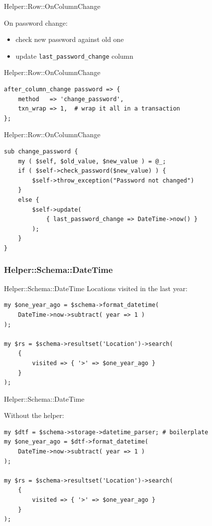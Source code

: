 \begin{frame}[fragile]{Helper::Row::OnColumnChange}

On password change:

\begin{itemize}
\item check new password against old one
\item update \verb|last_password_change| column
\end{itemize}

\end{frame}

\begin{frame}[fragile]{Helper::Row::OnColumnChange}
\begin{lstlisting}
after_column_change password => {
    method   => 'change_password',
    txn_wrap => 1,  # wrap it all in a transaction
};
\end{lstlisting}
\end{frame}

\begin{frame}[fragile]{Helper::Row::OnColumnChange}
\begin{lstlisting}
sub change_password {
    my ( $self, $old_value, $new_value ) = @_;
    if ( $self->check_password($new_value) ) {
        $self->throw_exception("Password not changed")
    }
    else {
        $self->update(
            { last_password_change => DateTime->now() }
        );
    }
}
\end{lstlisting}
\end{frame}

\subsubsection{Helper::Schema::DateTime}

\begin{frame}[fragile]{Helper::Schema::DateTime}
Locations visited in the last year:

\begin{lstlisting}
my $one_year_ago = $schema->format_datetime(
    DateTime->now->subtract( year => 1 )
);

my $rs = $schema->resultset('Location')->search(
    {
        visited => { '>' => $one_year_ago }
    }
);
\end{lstlisting}
\end{frame}

\begin{frame}[fragile]{Helper::Schema::DateTime}

Without the helper:

\begin{lstlisting}
my $dtf = $schema->storage->datetime_parser; # boilerplate
my $one_year_ago = $dtf->format_datetime(
    DateTime->now->subtract( year => 1 )
);

my $rs = $schema->resultset('Location')->search(
    {
        visited => { '>' => $one_year_ago }
    }
);
\end{lstlisting}
\end{frame}


